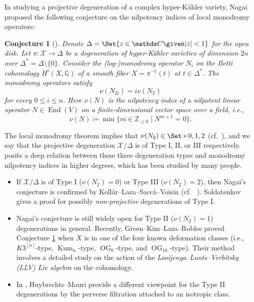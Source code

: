 \documentclass[12pt,reqno]{amsart}
\newtheorem{conj}[thm]{Conjecture}
\theoremstyle{definition}
\newcommand{\Q}{{\mathds Q}}
\newcommand{\Z}{{\mathds Z}}
\newcommand{\C}{{\mathds C}}
\newcommand\End{\mathop{\mathrm{End}}\nolimits}
\newcommand\Kum{\mathop{\mathrm{Kum}}\nolimits}
\newcommand\OG{\mathop{\mathrm{OG}}\nolimits}
\newcommand{\cX}{\mathcal{X}}
\numberwithin{equation}{section}
\begin{document}
In studying a projective degeneration of a complex hyper-Kähler variety, Nagai proposed the following conjecture on the nilpotency indices of local monodromy operators:
\begin{conj}[{\cite[Conjecture 5.1]{Nagai}}]
\label{Nagai Conjecture over C}
Denote $\Delta = \Set{z \in \C \given \lvert z \rvert <1}$ for the open disk. Let $\pi \colon \cX \to \Delta$ be a degeneration of hyper-Kähler varieties of dimension $2n$  over $\Delta^* =\Delta\setminus\{0\}$.
Consider the (log-)monodromy operator $N_i$ on the Betti cohomology $H^i(X,\Q)$ of a smooth fiber $X= \pi^{-1}(t)$ at $t \in \Delta^*$.
The monodromy operators satisfy
\[ \nu(N_{2i}) = i \nu(N_2) \] for every $0 \leq i \leq n$. Here $\nu(N)$ is the \emph{nilpotency index} of a nilpotent linear operator $N \in \End(V)$ on a finite-dimensional vector space over a field, i.e.,
\[
\nu(N) \coloneqq \min \{m \in \Z_{\geq 0} \mid N^{m+1} = 0\}.
\]
\end{conj}
The local monodromy theorem implies that $\nu(N_2) \in \Set*{0, 1,2}$ (cf.~\cite[(A.2)]{Landman}), and we say that the projective degeneration $\cX/\Delta$ is of Type I, II, or III respectively.  posits a deep relation between these three degeneration types and monodromy nilpotency indices in higher degrees, which has been studied by many people.
\begin{itemize}
    \item If $\cX/\Delta$ is of Type I ($\nu(N_2)=0$) or Type III ($\nu(N_2) =2)$, then Nagai's conjecture is confirmed by Kollár--Laza--Saccà--Voisin (cf.~ \cite[Theorem 1.7, Proposition 7.14 (2)]{KollarLaza2018a}). Soldatenkov \cite[Corollary 3.6]{Soldatenkov20a} gives a proof for possibly \emph{non-projective} degenerations of Type I.
    \item Nagai's conjecture is still widely open for Type II ($\nu(N_2)=1$) degenerations in general. Recently, Green--Kim--Laza--Robles \cite{GKLR} proved Conjecture \ref{Nagai Conjecture over C} when $X$ is in one of the four known deformation classes (i.e., $K3^{[n]}$-type, $\Kum_n$-type, $\OG_6$-type, and $\OG_{10}$-type). Their method involves a detailed study on the action of the \textit{Looijenga--Lunts--Verbitsky (LLV) Lie algebra} on the cohomology.
    \item In \cite{HuybrechtsMauri2023a}, Huybrechts--Mauri provide a different viewpoint for the Type II degenerations by the perverse filtration attached to an isotropic class.
\end{itemize}
\end{document}
